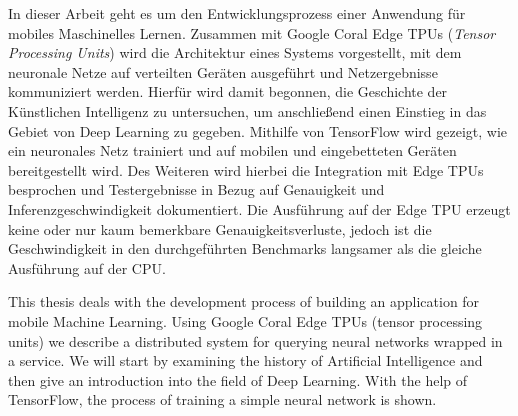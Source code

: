 \newenvironment{abstractpage}
{\cleardoublepage\vspace*{\fill}\thispagestyle{empty}}
{\vfill\cleardoublepage}
\newenvironment{myabstract}[1]
{\bigskip\selectlanguage{#1}
  \begin{center}
    \bfseries\abstractname
  \end{center}}
{\par\bigskip}

\begin{abstractpage}
\begin{myabstract}{german}
In dieser Arbeit geht es um den Entwicklungsprozess einer Anwendung
für mobiles Maschinelles Lernen. Zusammen mit Google Coral Edge TPUs
(\textit{Tensor Processing Units})
wird die Architektur eines Systems vorgestellt, mit dem
neuronale Netze auf verteilten Geräten ausgeführt
und Netzergebnisse kommuniziert werden.
Hierfür wird damit begonnen, die Geschichte der Künstlichen Intelligenz
zu untersuchen, um anschließend einen Einstieg in das Gebiet
von Deep Learning zu gegeben. Mithilfe von TensorFlow wird
gezeigt, wie ein neuronales Netz trainiert
und auf mobilen und eingebetteten Geräten bereitgestellt wird.
Des Weiteren wird hierbei die Integration mit Edge TPUs besprochen
und Testergebnisse in Bezug auf Genauigkeit und Inferenzgeschwindigkeit
dokumentiert. Die Ausführung auf der Edge TPU erzeugt keine
oder nur kaum bemerkbare Genauigkeitsverluste, jedoch ist die Geschwindigkeit
in den durchgeführten Benchmarks
langsamer als die gleiche Ausführung auf der CPU.
\end{myabstract}
\begin{myabstract}{english}
This thesis deals with the development process of building
an application for mobile Machine Learning.
Using Google Coral Edge TPUs (tensor processing units)
we describe a distributed system
for querying neural networks wrapped in a service.
We will start by examining the history of Artificial Intelligence
and then give an introduction into the field of Deep Learning.
With the help of TensorFlow, the process of training a simple
neural network is shown.
\end{myabstract}
\end{abstractpage}